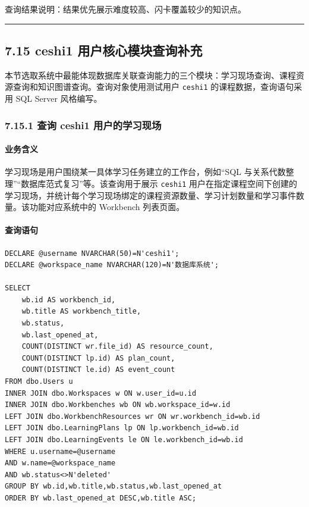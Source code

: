\documentclass[10pt,a4paper,fontset=none]{ctexart}
\begin{document}
查询结果说明：结果优先展示难度较高、闪卡覆盖较少的知识点。\par

\bigskip\hrule\bigskip

\subsection*{7.15 ceshi1 用户核心模块查询补充}

本节选取系统中最能体现数据库关联查询能力的三个模块：学习现场查询、课程资源查询和知识图谱查询。查询对象使用测试用户 \texttt{ceshi1} 的课程数据，查询语句采用 SQL Server 风格编写。\par

\subsubsection*{7.15.1 查询 ceshi1 用户的学习现场}

\paragraph*{业务含义}

学习现场是用户围绕某一具体学习任务建立的工作台，例如“SQL 与关系代数整理”“数据库范式复习”等。该查询用于展示 \texttt{ceshi1} 用户在指定课程空间下创建的学习现场，并统计每个学习现场绑定的课程资源数量、学习计划数量和学习事件数量。该功能对应系统中的 Workbench 列表页面。\par

\paragraph*{查询语句}

\begin{Verbatim}[fontsize=\scriptsize,frame=single]
DECLARE @username NVARCHAR(50)=N'ceshi1';
DECLARE @workspace_name NVARCHAR(120)=N'数据库系统';

SELECT
    wb.id AS workbench_id,
    wb.title AS workbench_title,
    wb.status,
    wb.last_opened_at,
    COUNT(DISTINCT wr.file_id) AS resource_count,
    COUNT(DISTINCT lp.id) AS plan_count,
    COUNT(DISTINCT le.id) AS event_count
FROM dbo.Users u
INNER JOIN dbo.Workspaces w ON w.user_id=u.id
INNER JOIN dbo.Workbenches wb ON wb.workspace_id=w.id
LEFT JOIN dbo.WorkbenchResources wr ON wr.workbench_id=wb.id
LEFT JOIN dbo.LearningPlans lp ON lp.workbench_id=wb.id
LEFT JOIN dbo.LearningEvents le ON le.workbench_id=wb.id
WHERE u.username=@username
AND w.name=@workspace_name
AND wb.status<>N'deleted'
GROUP BY wb.id,wb.title,wb.status,wb.last_opened_at
ORDER BY wb.last_opened_at DESC,wb.title ASC;
\end{Verbatim}
\end{document}
